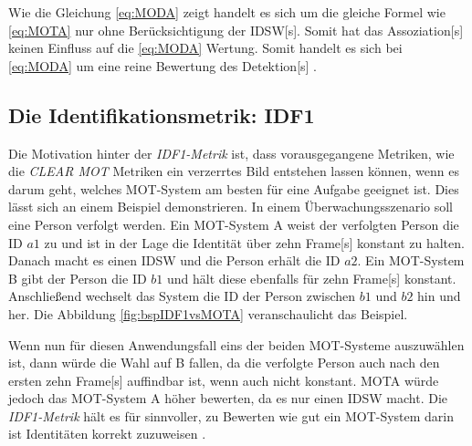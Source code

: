 Wie die Gleichung \ref{eq:MODA} zeigt handelt es sich um die gleiche Formel wie \ref{eq:MOTA} nur ohne Berücksichtigung der \gls{IDSW}[s]. Somit hat das \gls{Assoziation}[s] keinen Einfluss auf die \ref{eq:MODA} Wertung. Somit handelt es sich bei \ref{eq:MODA} um eine reine Bewertung des \gls{Detektion}[s] \cite{CLEAR.2008, HOTA, Kasturi.2009}.


\subsection{Die Identifikationsmetrik: IDF1}
Die Motivation hinter der \textit{IDF1-Metrik} ist, dass vorausgegangene Metriken, wie die \textit{\acrshort{CLEAR} \gls{MOT}} Metriken ein verzerrtes Bild entstehen lassen können, wenn es darum geht, welches \gls{MOT}-System am besten für eine Aufgabe geeignet ist. Dies lässt sich an einem Beispiel demonstrieren. In einem Überwachungsszenario soll eine Person verfolgt werden. Ein \gls{MOT}-System A weist der verfolgten Person die \acrshort{ID} \(a1\) zu und ist in der Lage die Identität über zehn \gls{Frame}[s] konstant zu halten. Danach macht es einen \gls{IDSW} und die Person erhält die \acrshort{ID} \(a2\). Ein \gls{MOT}-System B gibt der Person die \acrshort{ID} \(b1\) und hält diese ebenfalls für zehn \gls{Frame}[s] konstant. Anschließend wechselt das System die \acrshort{ID} der Person zwischen \(b1\) und \(b2\) hin und her. Die Abbildung \ref{fig:bspIDF1vsMOTA} veranschaulicht das Beispiel.


Wenn nun für diesen Anwendungsfall eins der beiden \gls{MOT}-Systeme auszuwählen ist, dann würde die Wahl auf B fallen, da die verfolgte Person auch nach den ersten zehn \gls{Frame}[s] auffindbar ist, wenn auch nicht konstant. \gls{MOTA} würde jedoch das \gls{MOT}-System A höher bewerten, da es nur einen \gls{IDSW} macht. Die \textit{IDF1-Metrik} hält es für sinnvoller, zu Bewerten wie gut ein \gls{MOT}-System darin ist Identitäten korrekt zuzuweisen \cite{IDF1}. \par

